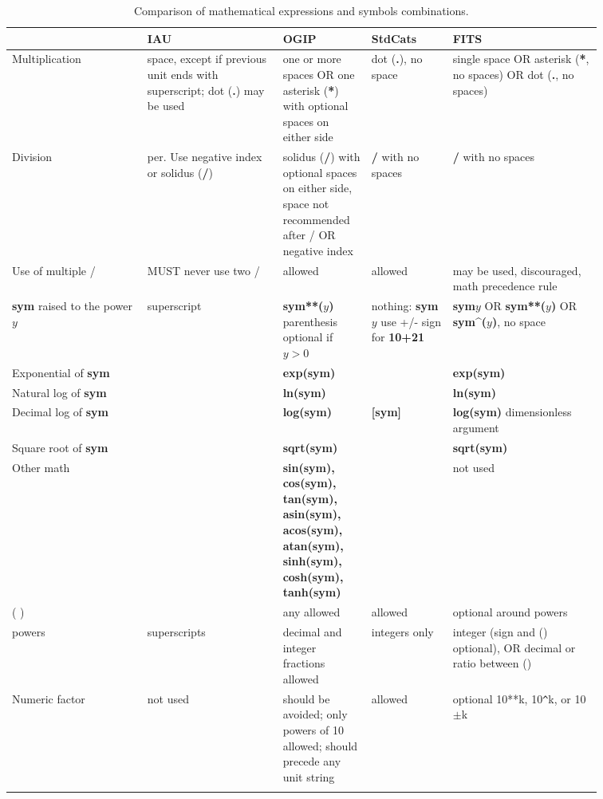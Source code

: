 \documentclass[11pt,notitlepage,onecolumn]{ivoa}
\newcommand{\unit}[1]{\textbf{\textsf{\color{orange}#1}}}
\begin{document}
\begin{longtable}[th]{|p{0.2\linewidth}|p{0.2\linewidth}|p{0.12\linewidth}|p{0.12\linewidth}|p{0.22\linewidth}|}
\hline
    & IAU & OGIP  & StdCats & FITS \\\hline
    Multiplication & space, except if previous unit ends with superscript; dot (\unit{.}) may be used\raggedright
    	& one or more spaces OR one asterisk (\unit{*}) with optional spaces on either side\raggedright 
	& dot (\unit{.}), no space 
	& single space OR asterisk (\unit{*}, no spaces) OR dot (\unit{.}, no spaces) \\\hline
    Division & per. Use negative index or solidus (\unit{/})\raggedright
    	& solidus (\unit{/}) with optional spaces on either side, space not recommended after / OR negative index\raggedright
	& \unit{/} with no spaces 
	& \unit{/} with no spaces  \\\hline\hline
    Use of multiple / & MUST never use two /\raggedright 
    	& allowed 
	& allowed 
	& may be used, discouraged, math precedence rule \\\hline\hline
    \unit{sym} raised to the power $y$ & superscript 
    	& \unit{sym**($y$)} parenthesis optional if $y>0$ 
	& nothing: \unit{sym$y$} use +/- sign for \unit{10+21} 
	& \unit{sym$y$} OR \unit{sym**($y$)} OR \unit{sym\^{}($y$)}, no space \\\hline\hline
    Exponential of \unit{sym} &  & \unit{exp(sym)} &  & \unit{exp(sym)} \\\hline\hline
    Natural log of \unit{sym} &  & \unit{ln(sym)} &  & \unit{ln(sym)} \\\hline\hline
    Decimal log of \unit{sym} &  & \unit{log(sym)} & \unit{[sym]} & \unit{log(sym)} dimensionless argument \\\hline\hline
    Square root of \unit{sym} &  & \unit{sqrt(sym)} &  & \unit{sqrt(sym)} \\\hline\hline
    Other math &  & {\small \unit{sin(sym), cos(sym), tan(sym), asin(sym), acos(sym), atan(sym), sinh(sym), cosh(sym), tanh(sym)} } &  & not used \\\hline\hline
    ( ) &  & any allowed & allowed & optional around powers \\\hline\hline
    powers & superscripts & decimal and integer fractions allowed & integers only & integer (sign and () optional), OR decimal or ratio between () \\\hline
    Numeric factor & not used & should be avoided; only powers of 10 allowed; should precede any unit string & allowed & optional 10**k, 10\verb|^|k, or 10$\pm$k \\\hline\hline
  \caption{Comparison of mathematical expressions and symbols combinations.}
  \label{tabx:comparUnitCombine}
\end{longtable}
\end{document}
